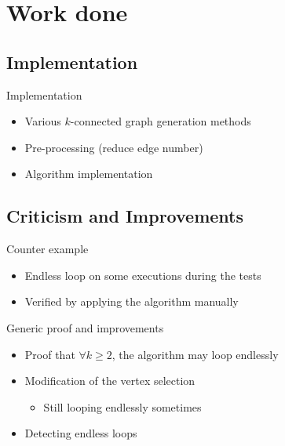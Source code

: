 \section{Work done}

\subsection{Implementation}
\begin{frame}{Implementation}
	\begin{itemize}
  \item Various $k$-connected graph generation methods
  \item Pre-processing (reduce edge number)
  \item Algorithm implementation
	\end{itemize}
\end{frame}

\subsection{Criticism and Improvements}
\begin{frame}{Counter example}
  \begin{itemize}
  \item Endless loop on some executions during the tests
  \item Verified by applying the algorithm manually
  \end{itemize}
\end{frame}


\begin{frame}{Generic proof and improvements}
  \begin{itemize}
  \item Proof that $\forall k \geq 2$, the algorithm may loop endlessly
  \item Modification of the vertex selection
    \begin{itemize}
    \item Still looping endlessly sometimes
    \end{itemize}
  \item Detecting endless loops
  \end{itemize}
\end{frame}

%
